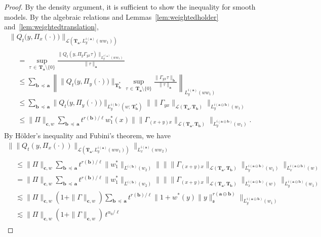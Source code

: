 \documentclass[AHL,Unicode,longabstracts,published]{cedram}
\newcommand{\mfs}{\mathfrak{s}}
\newcommand{\wco}{w^*}
\newcommand{\bfa}{\mathbf{a}}
\newcommand{\bfb}{\mathbf{b}}
\newcommand{\bfc}{\mathbf{c}}
\newcommand{\bfaob}{\mathbf{a}\ominus\mathbf{b}}
\newcommand{\bfT}{\mathbf{T}}
\newcommand{\mcL}{\mathcal{L}}
\begin{document}
\begin{proof}
By the density argument, it is sufficient to show the inequality for smooth models. By the algebraic relations and Lemmas~\ref{lem:weightedholder} and~\ref{lem:weightedtranslation},
\begingroup
\allowdisplaybreaks
\begin{multline*}
\big\|Q_t\big(y,\Pi_x(\cdot)\big)\big\|_{\mcL\left(\bfT_\bfa,L_y^{i(\bfa)}(ww_1)\right)}\\
\begin{aligned}
&=\sup_{\tau\,\in\,\bfT_\bfa\setminus\{0\}}\frac{\|Q_t(y,\Pi_y\Gamma_{yx}\tau)\|_{L_y^{i(\bfa)}(ww_1)}}{\|\tau\|_\bfa}\\
&\le\sum_{\bfb\,\preceq\,\bfa}\left\|\big\|Q_t\big(y,\Pi_y(\cdot)\big)\big\|_{\bfT_{\bfb}^*}
\sup_{\tau\,\in\,\bfT_\bfa\setminus\{0\}}\frac{\|\Gamma_{yx}\tau\|_{\bfb}}{\|\tau\|_\bfa}\right\|_{L_y^{i(\bfa)}(ww_1)}\\
&\le \sum_{\bfb\,\preceq\,\bfa}\big\|Q_t\big(y,\Pi_y(\cdot)\big)\big\|_{L_y^{i(\bfb)}\left(w;\,\bfT_\bfb^*\right)}
\big\|\|\Gamma_{yx}\|_{\mcL\left(\bfT_\bfa,\bfT_\bfb\right)}\big\|_{L_y^{i(\bfa\ominus\bfb)}(w_1)}\\
&\le \|\Pi\|_{\bfc,w}\sum_{\bfb\,\preceq\,\bfa}t^{r(\bfb)/\ell}\wco_1(x)
\big\|\|\Gamma_{(x+y)x}\|_{\mcL(\bfT_\bfa,\bfT_\bfb)}\big\|_{L_y^{i(\bfa\ominus\bfb)}(w_1)}.
\end{aligned}
\end{multline*}
\endgroup
By H\"older's inequality and Fubini's theorem, we have
\begingroup
\allowdisplaybreaks
\begin{multline*}
\Big\|\big\|Q_t\left(y,\Pi_x(\cdot)\right)\big\|_{\mcL(\bfT_\bfa,L_y^{i(\bfa)}(ww_1))}\Big\|_{L_x^{i(\bfa)}(ww_2)}\\
\begin{aligned}
&\le \|\Pi\|_{\bfc,w}\sum_{\bfb\,\preceq\,\bfa}t^{r(\bfb)/\ell}\|\wco_1\|_{L^{i(\bfb)}(w_2)}
\Big\|\big\|\|\Gamma_{(x+y)x}\|_{\mcL(\bfT_\bfa,\bfT_\bfb)}\big\|_{L_y^{i(\bfaob)}(w_1)}\Big\|_{L_x^{i(\bfaob)}(w)}\\
&=\|\Pi\|_{\bfc,w}\sum_{\bfb\,\preceq\,\bfa}t^{r(\bfb)/\ell}\|\wco_1\|_{L^{i(\bfb)}(w_2)}
\Big\|\big\|\|\Gamma_{(x+y)x}\|_{\mcL(\bfT_\bfa,\bfT_\bfb)}\big\|_{L_x^{i(\bfaob)}(w)}\Big\|_{L_y^{i(\bfaob)}(w_1)}\\
&\lesssim\|\Pi\|_{\bfc,w}(1+\|\Gamma\|_{\bfc,w})\sum_{\bfb\,\preceq\,\bfa}t^{r(\bfb)/\ell}\big\|1+\wco(y)\|y\|_\mfs^{r(\bfaob)}\big\|_{L_y^{i(\bfaob)}(w_1)}\\
&\lesssim\|\Pi\|_{\bfc,w}(1+\|\Gamma\|_{\bfc,w})\, t^{\alpha_0/\ell}
\end{aligned}

\end{multline*}
\end{proof}
\end{document}
